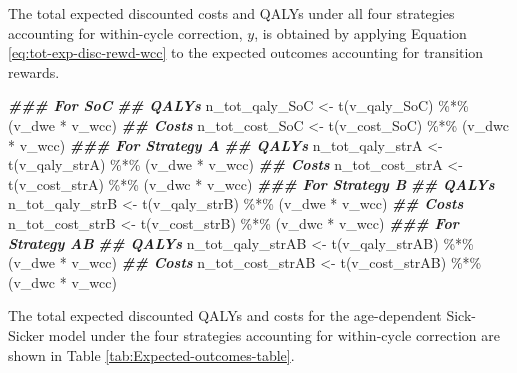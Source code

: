 \documentclass[
]{article}
\newenvironment{Shaded}{\begin{snugshade}}{\end{snugshade}}
\newcommand{\DocumentationTok}[1]{\textcolor[rgb]{0.56,0.35,0.01}{\textbf{\textit{#1}}}}
\newcommand{\FunctionTok}[1]{\textcolor[rgb]{0.00,0.00,0.00}{#1}}
\newcommand{\NormalTok}[1]{#1}
\newcommand{\OtherTok}[1]{\textcolor[rgb]{0.56,0.35,0.01}{#1}}
\newcommand{\SpecialCharTok}[1]{\textcolor[rgb]{0.00,0.00,0.00}{#1}}
\begin{document}
The total expected discounted costs and QALYs under all four strategies accounting for within-cycle correction, \(y\), is obtained by applying Equation \eqref{eq:tot-exp-disc-rewd-wcc} to the expected outcomes accounting for transition rewards.

\begin{Shaded}
\begin{Highlighting}[]
\DocumentationTok{\#\#\# For SoC}
\DocumentationTok{\#\# QALYs}
\NormalTok{n\_tot\_qaly\_SoC }\OtherTok{\textless{}{-}} \FunctionTok{t}\NormalTok{(v\_qaly\_SoC) }\SpecialCharTok{\%*\%}\NormalTok{ (v\_dwe }\SpecialCharTok{*}\NormalTok{ v\_wcc)}
\DocumentationTok{\#\# Costs}
\NormalTok{n\_tot\_cost\_SoC }\OtherTok{\textless{}{-}} \FunctionTok{t}\NormalTok{(v\_cost\_SoC) }\SpecialCharTok{\%*\%}\NormalTok{ (v\_dwc }\SpecialCharTok{*}\NormalTok{ v\_wcc)}
\DocumentationTok{\#\#\# For Strategy A}
\DocumentationTok{\#\# QALYs}
\NormalTok{n\_tot\_qaly\_strA }\OtherTok{\textless{}{-}} \FunctionTok{t}\NormalTok{(v\_qaly\_strA) }\SpecialCharTok{\%*\%}\NormalTok{ (v\_dwe }\SpecialCharTok{*}\NormalTok{ v\_wcc)}
\DocumentationTok{\#\# Costs}
\NormalTok{n\_tot\_cost\_strA }\OtherTok{\textless{}{-}} \FunctionTok{t}\NormalTok{(v\_cost\_strA) }\SpecialCharTok{\%*\%}\NormalTok{ (v\_dwc }\SpecialCharTok{*}\NormalTok{ v\_wcc)}
\DocumentationTok{\#\#\# For Strategy B}
\DocumentationTok{\#\# QALYs}
\NormalTok{n\_tot\_qaly\_strB }\OtherTok{\textless{}{-}} \FunctionTok{t}\NormalTok{(v\_qaly\_strB) }\SpecialCharTok{\%*\%}\NormalTok{ (v\_dwe }\SpecialCharTok{*}\NormalTok{ v\_wcc)}
\DocumentationTok{\#\# Costs}
\NormalTok{n\_tot\_cost\_strB }\OtherTok{\textless{}{-}} \FunctionTok{t}\NormalTok{(v\_cost\_strB) }\SpecialCharTok{\%*\%}\NormalTok{ (v\_dwc }\SpecialCharTok{*}\NormalTok{ v\_wcc)}
\DocumentationTok{\#\#\# For Strategy AB}
\DocumentationTok{\#\# QALYs}
\NormalTok{n\_tot\_qaly\_strAB }\OtherTok{\textless{}{-}} \FunctionTok{t}\NormalTok{(v\_qaly\_strAB) }\SpecialCharTok{\%*\%}\NormalTok{ (v\_dwe }\SpecialCharTok{*}\NormalTok{ v\_wcc)}
\DocumentationTok{\#\# Costs}
\NormalTok{n\_tot\_cost\_strAB }\OtherTok{\textless{}{-}} \FunctionTok{t}\NormalTok{(v\_cost\_strAB) }\SpecialCharTok{\%*\%}\NormalTok{ (v\_dwc }\SpecialCharTok{*}\NormalTok{ v\_wcc)}
\end{Highlighting}
\end{Shaded}

The total expected discounted QALYs and costs for the age-dependent Sick-Sicker model under the four strategies accounting for within-cycle correction are shown in Table \ref{tab:Expected-outcomes-table}.
\end{document}
